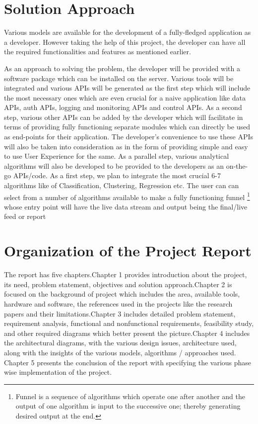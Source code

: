 \documentclass[a4paper,12pt]{report}
\begin{document}
    \section{Solution Approach}
Various models are available for the development of a fully-fledged application as a developer. However taking the help of this project, the developer can have all the required functionalities and features as mentioned earlier.

As an approach to solving the problem, the developer will be provided with a software package which can be installed on the server. Various tools will be integrated and various APIs will be generated as the first step which will include the most necessary ones which are even crucial for a naive application like data APIs, auth APIs, logging and monitoring APIs and control APIs.
As a second step, various other APIs can be added by the developer which will facilitate in terms of providing fully functioning separate modules which can directly be used as end-points for their application.
The developer’s convenience to use these APIs will also be taken into consideration as in the form of providing simple and easy to use User Experience for the same.
As a parallel step, various analytical algorithms will also be developed to be provided to the developers as an on-the-go APIs/code. As a first step, we plan to integrate the most crucial 6-7 algorithms like of Classification, Clustering, Regression etc.
The user can can select from a number of algorithms available to make a fully functioning funnel \footnote{Funnel is a sequence of algorithms which operate one after another and the output of one algorithm is input to the successive one; thereby generating desired output at the end.} whose entry point will have the live data stream and output being the final/live feed or report    
\section{Organization of the Project Report}    
The report has five chapters.Chapter 1 provides introduction about the project, its need, problem statement, objectives and solution approach.Chapter 2 is focused on the background of project which includes the area, available tools, hardware and software, the references used in the projects like the research papers and their limitations.Chapter 3 includes detailed problem statement, requirement analysis, functional and nonfunctional requirements, feasibility study, and other required diagrams which better present the picture.Chapter 4 includes the architectural diagrams, with the various design issues, architecture used, along with the insights of the various models, algorithms / approaches used. Chapter 5 presents the conclusion of the report with specifying the various phase wise implementation of the project.
\end{document}

